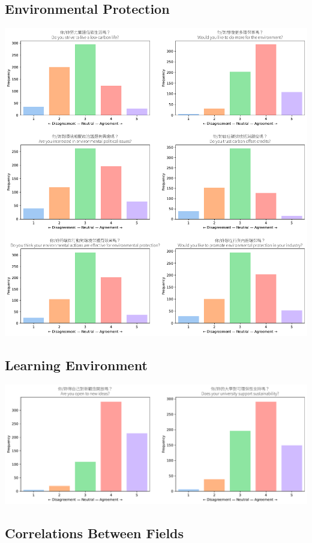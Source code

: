 \documentclass[
  letterpaper,
  DIV=11,
  numbers=noendperiod]{scrartcl}
\begin{document}
\subsection{Environmental Protection}\label{environmental-protection}

\includegraphics{_thesis_files/figure-pdf/cell-16-output-1.pdf}

\subsection{Learning Environment}\label{learning-environment}

\includegraphics{_thesis_files/figure-pdf/cell-17-output-1.pdf}

\subsection{Correlations Between
Fields}\label{correlations-between-fields}
\end{document}
